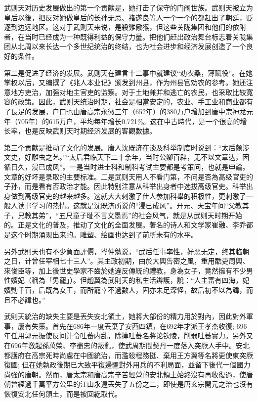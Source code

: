 武则天对历史发展做出的第一个贡献是，她打击了保守的门阀世族。武则天被立为皇后以後，把反对她做皇后的长孙无忌、褚遂良等人一个一个的都赶出了朝廷，贬逐到边远地区。这对于武则天来说，是殺雞儆猴，但这些关陇集团和他们的依附者，在当时已经成为一种既得利益的保守力量。把他们赶出政治舞台标志着关陇集团从北周以来长达一个多世纪统治的终结，也为社会进步和经济发展创造了一个良好的条件。

第二是促进了经济的发展。武则天在建言十二事中就建议“劝农桑，薄赋役”。在她掌权以后，又编撰了《兆人本业记》颁发到州县，作为州县官劝农的参考。她还注意地方吏治，加强对地主官吏的监察。对于土地兼并和逃亡的农民，也采取比较寛容的政策。因此，武则天统治时期，社会是相當安定的，农业、手工业和商业都有了長足的发展，户口也由唐高宗永徽三年（652年）的380万户增加到唐中宗神龙元年（705年）的615万户，平均每年增长0.721\%。这在中古時代，是一个很高的增长率，也是反映武则天时期经济发展的客觀數據。

第三个贡献是推动了文化的发展。唐人沈既济在谈及科举制度时说到：“太后颇涉文史，好雕虫之艺。”“太后君临天下二十余年，当时公卿百辟，无不以文章达，因循日久，浸已成风”。一是当时进士科和制科考试主要都是考策问，也就是申論。文章的好坏是录取的主要标准。二是武则天用人不看门第，不问是否為高级官吏的子孙，而是看有否政治才能。因此特别注意从科举出身者中选拔高级官吏。科举出身做到高级官吏的越来越多。这就大大刺激了仕人参加科舉的积极性，更刺激了一般人读书学习的热情。这就是沈既济所说的“浸已成风”。开元、天宝年间“父教其子，兄教其弟”，“五尺童子耻不言文墨焉”的社会风气，就是从武则天时期开始的。正是文化的普及，推动了文化的全面发展。著名的诗人和文学家崔融、李乔都是这个时期涌现出来的。雕塑、绘画也达到了前所未有的水平。

另外武則天也有不少負面評價，岑仲勉说，“武后任事率性，好恶无定，终其临朝之日，计曾任宰相七十三人”。其主政初期，由於大興告密之風，重用酷吏周興、來俊臣等，加上後世史學家不齒於她違反傳統的禮教，身為女子，竟然擁有不少男性嬪妃（稱為「男寵」）。但趙翼為武則天的私生活辯護，說：“人主富有四海，妃嬪動千百，后既為女王，而所寵幸不過數人，固亦未足深怪，故后初不以為諱，而且不必諱也。”

武則天統治的缺失主要是丟失安北領土，她將大部份的精力用於對內，因此對外軍事，屢有失策。首先在686年一度丟棄了安西四鎮，在692年才派王孝杰收復; 696年任用郭元振使反间计令吐蕃内乱，除掉吐蕃名將论钦陵，削弱吐蕃實力。另外又在696年激起孫萬榮、李盡忠的叛亂，使武周期間契丹一度落入突厥人手中。安北都護府在高宗死時尚處在中國統治，而濫殺程務挺、棄用王方翼等名將更使東突厥復國; 但在她執政後期已大致平復邊疆對外用兵的不利局面，並留下後代一個國力尚強的唐朝。然而，唐太宗和唐高宗辛苦經營的安北領土始終沒有再收復過，使唐朝曾經過千萬平方公里的江山永遠丟失了五份之二，即使是唐玄宗開元之治也沒有恢復安北任何領土，而是被回紇取代。

